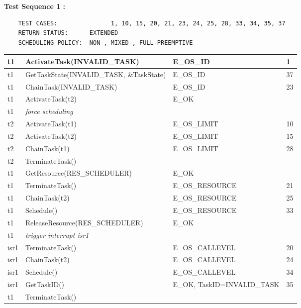 \documentclass[10pt]{article}
\newlength{\Li}\settowidth{\Li}{Running}
\newlength{\Lii}\setlength{\Lii}{7cm}
\newlength{\Liiii}\setlength{\Liiii}{0.9cm}
\newlength{\Liii}\setlength{\Liii}{\textwidth} \addtolength{\Liii}{-\Li} \addtolength{\Liii}{-\Lii} \addtolength{\Liii}{-\Liiii}
\begin{document}
	\textbf{Test Sequence 1 :}
	\begin{lstlisting}
	TEST CASES:				  1, 10, 15, 20, 21, 23, 24, 25, 28, 33, 34, 35, 37
	RETURN STATUS:	  	EXTENDED
	SCHEDULING POLICY:	NON-, MIXED-, FULL-PREEMPTIVE
	\end{lstlisting}	
	
	
	\begin{supertabular}{|p{\Li}|p{\Lii}|p{\Liii}|p{\Liiii}|} \hline 
	t1 	& ActivateTask(INVALID\_TASK)			& E\_OS\_ID			&  1 \\ \hline 
	t1 	& GetTaskState(INVALID\_TASK, \&TaskState)	& E\_OS\_ID 			& 37 \\ \hline 
	t1 	& ChainTask(INVALID\_TASK) 			& E\_OS\_ID 			& 23 \\ \hline 
	t1 	& ActivateTask(t2) 					& E\_OK 				& \\ \hline 
	t1 	& \textit{force scheduling}					& 					& \\ \hline 
	t2 	& ActivateTask(t1) 					& E\_OS\_LIMIT 		& 10 \\ \hline 
	t2 	& ActivateTask(t2) 					& E\_OS\_LIMIT 		& 15 \\ \hline 
	t2 	& ChainTask(t1) 					& E\_OS\_LIMIT 		& 28 \\ \hline 
	t2 	& TerminateTask()						& 					& \\ \hline
	t1 	& GetResource(RES\_SCHEDULER) 		& E\_OK 				& \\ \hline 
	t1 	& TerminateTask() 						& E\_OS\_RESOURCE 	& 21 \\ \hline 
	t1 	& ChainTask(t2) 					& E\_OS\_RESOURCE 	& 25 \\ \hline
	t1 	& Schedule()		 					& E\_OS\_RESOURCE 	& 33 \\ \hline 
	t1 	& ReleaseResource(RES\_SCHEDULER)	& E\_OK 				& \\ \hline 
	t1 	& \textit{trigger interrupt isr1}				& 					& \\ \hline 
	isr1  	& TerminateTask() 						& E\_OS\_CALLEVEL 	& 20 \\ \hline 
	isr1  	& ChainTask(t2)				 		& E\_OS\_CALLEVEL 	& 24 \\ \hline 
	isr1 	& Schedule() 							& E\_OS\_CALLEVEL 	& 34 \\ \hline 
	isr1 	& GetTaskID()							& E\_OK, TaskID=INVALID\_TASK	& 35 \\ \hline 
	t1	& TerminateTask()						& 					& \\ \hline 
	\end{supertabular} \\
	
\end{document}
